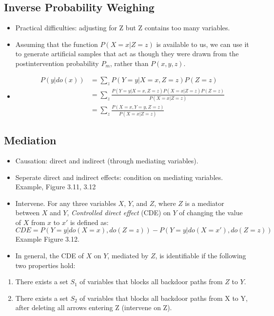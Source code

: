 \documentclass[]{article}
\providecommand{\tightlist}{%
  \setlength{\itemsep}{0pt}\setlength{\parskip}{0pt}}
\begin{document}
\subsection{Inverse Probability
Weighing}\label{inverse-probability-weighing}

\begin{itemize}
\item
  Practical difficulties: adjusting for Z but Z contains too many
  variables.
\item
  Assuming that the function \(P(X = x|Z = z)\) is available to us, we
  can use it to generate artificial samples that act as though they were
  drawn from the postintervention probability \(P_m\), rather than
  \(P(x, y, z)\).
\item
  \begin{equation*}
  \begin{split}
  P(y|do(x)) &= \sum_z P(Y = y|X = x, Z = z)P(Z = z)\\
         &= \sum_z \frac{P(Y = y|X = x, Z = z)P(X = x|Z = z)P(Z = z)}{P(X = x|Z = z)}\\
         &= \sum_z \frac{P(X = x, Y = y, Z = z)}{P(X = x|Z = z)}
  \end{split}
  \end{equation*}
\end{itemize}

\subsection{Mediation}\label{mediation}

\begin{itemize}
\item
  Causation: direct and indirect (through mediating variables).
\item
  Seperate direct and indirect effects: condition on mediating
  variables. Example, Figure 3.11, 3.12
\item
  Intervene. For any three variables \(X\), \(Y\), and \(Z\), where
  \(Z\) is a mediator between \(X\) and \(Y\), \emph{Controlled direct
  effect} (CDE) on \(Y\) of changing the value of \(X\) from \(x\) to
  \(x'\) is defined as: \[
  CDE = P(Y = y|do(X = x), do(Z = z)) - P(Y = y|do(X = x'), do(Z = z))
  \] Example Figure 3.12.
\item
  In general, the CDE of \(X\) on \(Y\), mediated by \(Z\), is
  identifiable if the following two properties hold:
\end{itemize}

\begin{enumerate}
\def\labelenumi{\arabic{enumi}.}
\tightlist
\item
  There exists a set \(S_1\) of variables that blocks all backdoor paths
  from \(Z\) to \(Y\).
\item
  There exists a set \(S_2\) of variables that blocks all backdoor paths
  from X to Y, after deleting all arrows entering Z (intervene on Z).
\end{enumerate}
\end{document}
